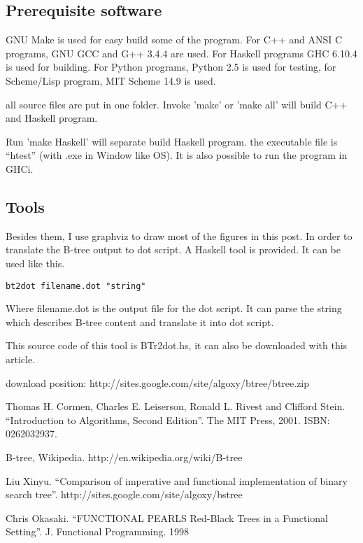 \documentclass{article}
\begin{document}
\subsection{Prerequisite software}
GNU Make is used for easy build some of the program. For C++ and ANSI C programs,
GNU GCC and G++ 3.4.4 are used.
For Haskell programs GHC 6.10.4 is used
for building. For Python programs, Python 2.5 is used for testing, for
Scheme/Lisp program, MIT Scheme 14.9 is used.

all source files are put in one folder. Invoke 'make' or 'make all'
will build C++ and Haskell program.

Run 'make Haskell' will separate build Haskell program. the executable
file is ``htest'' (with .exe
in Window like OS). It is also possible to run the program in GHCi.

\subsection{Tools}

Besides them, I use graphviz to draw most of the figures in this post. In order to
translate the B-tree output to dot script. A Haskell tool is provided.
It can be used like this.

\begin{verbatim}
bt2dot filename.dot "string"
\end{verbatim}

Where filename.dot is the output file for the dot script. It can
parse the string which describes B-tree content and translate it
into dot script.

This source code of this tool is BTr2dot.hs, it can also be downloaded
with this article.

download position: http://sites.google.com/site/algoxy/btree/btree.zip

\begin{thebibliography}{99}

Thomas H. Cormen, Charles E. Leiserson, Ronald L. Rivest and Clifford Stein. ``Introduction to Algorithms, Second Edition''. The MIT Press, 2001. ISBN: 0262032937.

B-tree, Wikipedia. http://en.wikipedia.org/wiki/B-tree

Liu Xinyu. ``Comparison of imperative and functional implementation of
binary search tree''. http://sites.google.com/site/algoxy/bstree

Chris Okasaki. ``FUNCTIONAL PEARLS Red-Black Trees in a Functional Setting''. J. Functional Programming. 1998

\end{thebibliography}

\ifx\wholebook\relax \else
\end{document}

